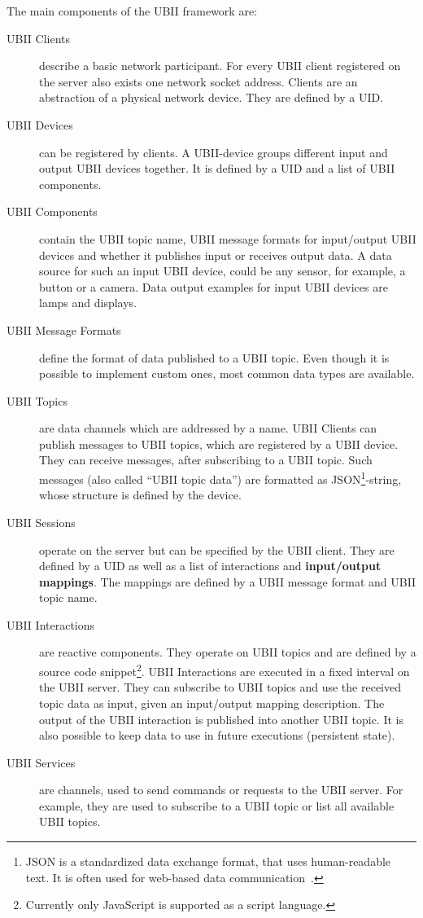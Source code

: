 The main components of the \ac{UBII} framework are:
\begin{description}
	\item[\ac{UBII} Clients] describe a basic network participant. For every \ac{UBII} client registered on the server also exists one network socket address. Clients are an abstraction of a physical network device. They are defined by a \ac{UID}. 
	\item[\ac{UBII} Devices] can be registered by clients. A \ac{UBII}-device groups different input and output \ac{UBII} devices together. It is defined by a \ac{UID} and a list of \ac{UBII} components.
  \item[\ac{UBII} Components] contain the \ac{UBII} topic name, \ac{UBII} message formats for input/output \ac{UBII} devices and whether it publishes input or receives output data. A data source for such an input \ac{UBII} device, could be any sensor, for example, a button or a camera. Data output examples for input \ac{UBII} devices are lamps and displays.
  \item[\ac{UBII} Message Formats] define the format of data published to a \ac{UBII} topic. Even though it is possible to implement custom ones, most common data types are available.  %
	\item[\ac{UBII} Topics] are data channels which are addressed by a name. \ac{UBII} Clients can publish messages to \ac{UBII} topics, which are registered by a \ac{UBII} device. They can receive messages, after subscribing to a \ac{UBII} topic. Such messages (also called \enquote{\ac{UBII} topic data}) are formatted as JSON\footnote{JSON is a standardized data exchange format, that uses human-readable text. It is often used for web-based data communication~\cite[iii]{ECMAInternational.2017}.}-string, whose structure is defined by the device.
	\item[\ac{UBII} Sessions] operate on the server but can be specified by the \ac{UBII} client. They are defined by a \ac{UID} as well as a list of interactions and \textbf{input/output mappings}. The mappings are defined by a \ac{UBII} message format and \ac{UBII} topic name.
	\item[\ac{UBII} Interactions] are reactive components. They operate on \ac{UBII} topics and are defined by a source code snippet\footnote{Currently only JavaScript is supported as a script language.}. \ac{UBII} Interactions are executed in a fixed interval on the \ac{UBII} server. They can subscribe to \ac{UBII} topics and use the received topic data as input, given an input/output mapping description. The output of the \ac{UBII} interaction is published into another \ac{UBII} topic. It is also possible to keep data to use in future executions (persistent state).
	\item[\ac{UBII} Services] are channels, used to send commands or requests to the \ac{UBII} server. For example, they are used to subscribe to a \ac{UBII} topic or list all available \ac{UBII} topics.
\end{description}

